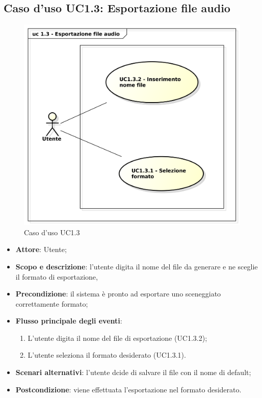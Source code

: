 \subsection{Caso d'uso UC1.3: Esportazione file audio}

\begin{figure}[htbp]
\centering
\includegraphics[scale=0.5]{UseCase_17_03_2016/immagini/uc_1_3_esportazione_audio_finale.png}
\captionsetup{labelfont=bf}
\caption{Caso d'uso UC1.3}
\end{figure}

\begin{itemize}
\item \textbf{Attore}: Utente;
\item \textbf{Scopo e descrizione}: l'utente digita il nome del file da generare e ne sceglie il formato di esportazione, 
\item \textbf{Precondizione}: il sistema è pronto ad esportare uno sceneggiato correttamente formato;
\item \textbf{Flusso principale degli eventi}:
\begin{enumerate}
\item L'utente digita il nome del file di esportazione (UC1.3.2);
\item L'utente seleziona il formato desiderato (UC1.3.1).
\end{enumerate}
\item \textbf{Scenari alternativi}: l'utente dcide di salvare il file con il nome di default; 
\item \textbf{Postcondizione}: viene effettuata l'esportazione nel formato desiderato.  
\end{itemize}

